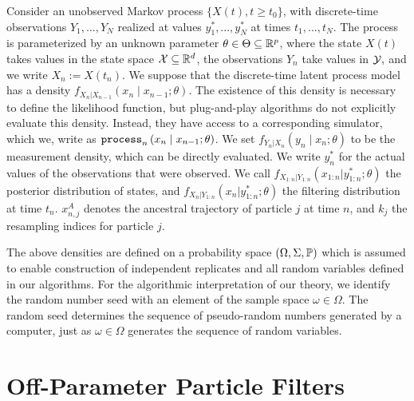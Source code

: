 \documentclass[numsec,webpdf,modern,medium,namedate]{oup-authoring-template}
\theoremstyle{thmstyleone}%
\theoremstyle{thmstyletwo}%
\theoremstyle{thmstylethree}%
\begin{document}
Consider an unobserved Markov process $\{X(t),t  \geq t_0\}$, with discrete-time observations $Y_1,...,Y_N$ realized at values $y_1^*,...,y_N^*$ at times $t_1,..., t_N$.
The process is parameterized by an unknown parameter $\theta \in \Theta \subseteq \mathbb{R}^p$, where the state $X(t)$ takes values in the state space ${\mathcal{X}} \subseteq \mathbb{R}^d$, the observations $Y_n$ take values in ${\mathcal{Y}},$ and we write $X_n := X(t_n)$. We suppose that the discrete-time latent process model has a density $f_{X_n|X_{n-1}}\left(x_{n} \mid x_{n-1}; \theta\right)$.
The existence of this density is necessary to define the likelihood function, but plug-and-play algorithms do not explicitly evaluate this density.
Instead, they have access to a corresponding simulator, which we, write as $\texttt{process}_n\left(x_n\mid x_{n-1}; \theta\right)$.
We set $f_{Y_n|X_n}\left(y_n \mid x_n; \theta\right)$ to be the measurement density, which  can be directly evaluated. We write $y_n^*$ for the actual values of the observations that were observed.
We call $f_{X_{1:n}|Y_{1:n}}(x_{1:n}|y_{1:n}^*; \theta)$ the posterior distribution of states, and $f_{X_{n}|Y_{1:n}}(x_n|y_{1:n}^*; \theta)$ the filtering distribution at time $t_n$.
$x_{n,j}^A$ denotes the ancestral trajectory of particle $j$ at time $n$,  and $k_j$ the resampling indices for particle $j$. 

The above densities are defined on a probability space $(\Omega, \Sigma, \mathbb{P})$ which is assumed to enable construction of independent replicates and all random variables defined in our algorithms.
For the algorithmic interpretation of our theory, we identify the random number seed with an element of the sample space $\omega \in \Omega$. The random seed determines the sequence of pseudo-random numbers generated by a computer, just as $\omega\in\Omega$ generates the sequence of random variables.



\section{Off-Parameter Particle Filters}
\end{document}
